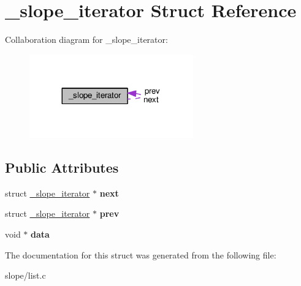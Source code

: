 \hypertarget{struct__slope__iterator}{\section{\+\_\+slope\+\_\+iterator Struct Reference}
\label{struct__slope__iterator}
}


Collaboration diagram for \+\_\+slope\+\_\+iterator\+:
\nopagebreak
\begin{figure}[H]
\begin{center}
\leavevmode
\includegraphics[width=200pt]{struct__slope__iterator__coll__graph}
\end{center}
\end{figure}
\subsection*{Public Attributes}
\begin{DoxyCompactItemize}
\item 
\hypertarget{struct__slope__iterator_a2e350fc606387696fa30b8bf28f65b81}{struct \hyperlink{struct__slope__iterator}{\+\_\+slope\+\_\+iterator} $\ast$ {\bfseries next}}\label{struct__slope__iterator_a2e350fc606387696fa30b8bf28f65b81}

\item 
\hypertarget{struct__slope__iterator_ad1f3246238c01985972820139a2729dd}{struct \hyperlink{struct__slope__iterator}{\+\_\+slope\+\_\+iterator} $\ast$ {\bfseries prev}}\label{struct__slope__iterator_ad1f3246238c01985972820139a2729dd}

\item 
\hypertarget{struct__slope__iterator_af9a1a22abb8ffc7b7a67cdf58be7aa6f}{void $\ast$ {\bfseries data}}\label{struct__slope__iterator_af9a1a22abb8ffc7b7a67cdf58be7aa6f}

\end{DoxyCompactItemize}


The documentation for this struct was generated from the following file\+:\begin{DoxyCompactItemize}
\item 
slope/list.\+c\end{DoxyCompactItemize}
